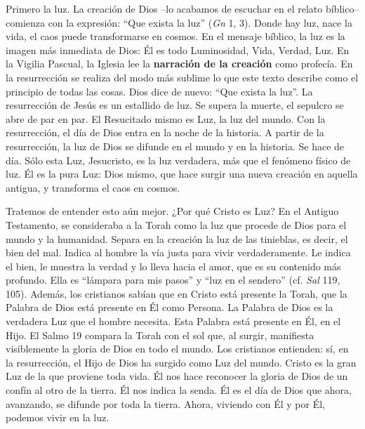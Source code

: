			\begin{body}Primero la luz. La creación de Dios –lo acabamos de escuchar en el relato bíblico– comienza con la expresión: “Que exista la luz” (\textit{Gn} 1, 3). Donde hay luz, nace la vida, el caos puede transformarse en cosmos. En el mensaje bíblico, la luz es la imagen más inmediata de Dios: Él es todo Luminosidad, Vida, Verdad, Luz. En la Vigilia Pascual, la Iglesia lee la \textbf{narración de la creación} como profecía. En la resurrección se realiza del modo más sublime lo que este texto describe como el principio de todas las cosas. Dios dice de nuevo: “Que exista la luz”. La resurrección de Jesús es un estallido de luz. Se supera la muerte, el sepulcro se abre de par en par. El Resucitado mismo es Luz, la luz del mundo. Con la resurrección, el día de Dios entra en la noche de la historia. A partir de la resurrección, la luz de Dios se difunde en el mundo y en la historia. Se hace de día. Sólo esta Luz, Jesucristo, es la luz verdadera, más que el fenómeno físico de luz. Él es la pura Luz: Dios mismo, que hace surgir una nueva creación en aquella antigua, y transforma el caos en cosmos.\end{body}
			
			\begin{body}Tratemos de entender esto aún mejor. ¿Por qué Cristo es Luz? En el Antiguo Testamento, se consideraba a la Torah como la luz que procede de Dios para el mundo y la humanidad. Separa en la creación la luz de las tinieblas, es decir, el bien del mal. Indica al hombre la vía justa para vivir verdaderamente. Le indica el bien, le muestra la verdad y lo lleva hacia el amor, que es su contenido más profundo. Ella es “lámpara para mis pasos” y “luz en el sendero” (cf. \textit{Sal} 119, 105). Además, los cristianos sabían que en Cristo está presente la Torah, que la Palabra de Dios está presente en Él como Persona. La Palabra de Dios es la verdadera Luz que el hombre necesita. Esta Palabra está presente en Él, en el Hijo. El Salmo 19 compara la Torah con el sol que, al surgir, manifiesta visiblemente la gloria de Dios en todo el mundo. Los cristianos entienden: sí, en la resurrección, el Hijo de Dios ha surgido como Luz del mundo. Cristo es la gran Luz de la que proviene toda vida. Él nos hace reconocer la gloria de Dios de un confín al otro de la tierra. Él nos indica la senda. Él es el día de Dios que ahora, avanzando, se difunde por toda la tierra. Ahora, viviendo con Él y por Él, podemos vivir en la luz.\end{body}
			
